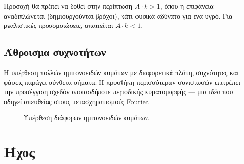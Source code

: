\documentclass[a4paper, 11pt]{article}
\begin{document}
Προσοχή θα πρέπει να δοθεί στην περίπτωση \(A \cdot k > 1\), όπου η
επιφάνεια αναδιπλώνεται (δημιουργούνται βρόχοι), κάτι φυσικά αδύνατο για
ένα υγρό. Για ρεαλιστικές προσομοιώσεις, απαιτείται \(A \cdot k < 1\).

\subsection{Άθροισμα
συχνοτήτων}\label{ux3acux3b8ux3c1ux3bfux3b9ux3c3ux3bcux3b1-ux3c3ux3c5ux3c7ux3bdux3bfux3c4ux3aeux3c4ux3c9ux3bd}

Η υπέρθεση πολλών ημιτονοειδών κυμάτων με διαφορετικά πλάτη, συχνότητες
και φάσεις παράγει σύνθετα σήματα. Η προσθήκη περισσότερων συνιστωσών
επιτρέπει την προσέγγιση σχεδόν οποιασδήποτε περιοδικής κυματομορφής ---
μια ιδέα που οδηγεί απευθείας στους μετασχηματισμούς Fourier.

\begin{figure}[htbp]
\centering
{}
\caption{
Υπέρθεση διάφορων ημιτονοειδών κυμάτων.
}
\label{fig:fourier_superposition}
\end{figure}

\section{Ήχος}\label{ux3aeux3c7ux3bfux3c2}
\end{document}
